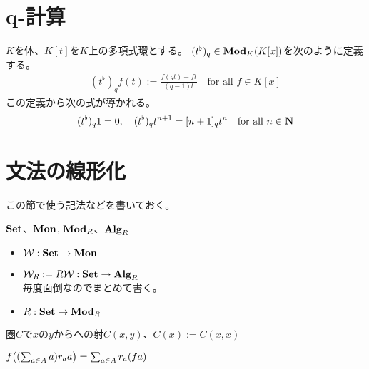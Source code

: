 \newcommand{\Brz}{\mycal{B}}
\newcommand{\cat}[1]{\mybf{{#1}}}
%
{\setlength\arraycolsep{2pt}
%
\section{q-計算}\label{s1:q-計算} %
	$K$を体、$K[t]$を$K$上の多項式環とする。
	$(t^\flat)_q\in\cat{Mod}_K(K[x])$を次のように定義する。
	\begin{equation*}\begin{split}
		(t^\flat)_qf(t) := \frac{f(qt) - ft}{(q - 1)t}
		\quad\text{for all } f\in K[x]
	\end{split}\end{equation*}
	この定義から次の式が導かれる。
	\begin{equation*}\begin{split}
		(t^\flat)_q1 = 0,\quad (t^\flat)_qt^{n+1} = [n+1]_qt^n 
		\quad\text{for all } n\in\mathbf{N}
	\end{split}\end{equation*}
\section{文法の線形化}\label{s1:文法の線形化} %
	この節で使う記法などを書いておく。

	\begin{description}\setlength{\itemsep}{-1mm} %
		\item[圏] $\cat{Set}$、$\cat{Mon}$, $\cat{Mod}_R$、$\cat{Alg}_R$
		\item[普遍な対象] 
		\begin{itemize}\setlength{\itemsep}{-1mm} %
			\item $\W:\cat{Set}\to\cat{Mon}$
			\item $\W_R:=R\W:\cat{Set}\to\cat{Alg}_R$ \\
			毎度面倒なのでまとめて書く。
			\item $R:\cat{Set}\to\cat{Mod}_R$
		\end{itemize} %
		\item[Homset] 圏$C$で$x$の$y$からへの射$C(x,y)$、$C(x):=C(x,x)$
		\item[加群の線形射] $f\bigl({(\sum_{a\in A}a)r_aa}\bigr)=\sum_{a\in A}r_a(fa)$
	\end{description} %

}
